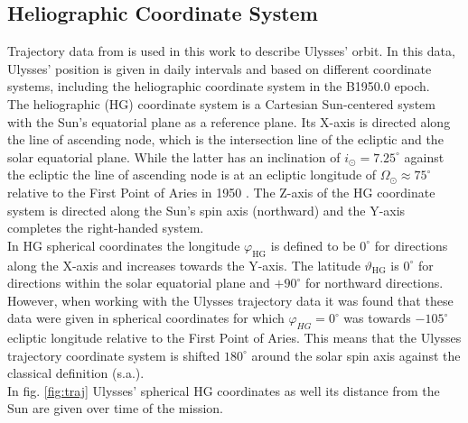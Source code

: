 \subsection{Heliographic Coordinate System}
Trajectory data from \citet{ulysses-data-archive} is used in this work to describe Ulysses' orbit. In this data, Ulysses' position is given in daily intervals and based on different coordinate systems, including the heliographic coordinate system in the B1950.0 epoch.\\
The heliographic (HG) coordinate system is a Cartesian Sun-centered system with the Sun's equatorial plane as a reference plane. Its X-axis is directed along the line of ascending node, which is the intersection line of the ecliptic and the solar equatorial plane. While the latter has an inclination of $i_\odot = 7.25 ^\circ$ against the ecliptic \citep{fraenz_harper} the line of ascending node is at an ecliptic longitude of $\Omega_\odot \approx 75^\circ$ relative to the First Point of Aries in 1950 \citep{nasa-earth-coord}. The Z-axis of the HG coordinate system is directed along the Sun's spin axis (northward) and the Y-axis completes the right-handed system. \\
In HG spherical coordinates the longitude $\varphi_{\mathrm{HG}}$ is defined to be $0^\circ$ for directions along the X-axis and increases towards the Y-axis. The latitude $\vartheta_{\mathrm{HG}}$ is $0^\circ$ for directions within the solar equatorial plane and $+90^\circ$ for northward directions.\\ 
However, when working with the Ulysses trajectory data it was found that these data were given in spherical coordinates for which $\varphi_{HG} = 0^\circ$ was towards $-105 ^\circ$ ecliptic longitude relative to the First Point of Aries. This means that the Ulysses trajectory coordinate system is shifted $180^\circ$ around the solar spin axis against the classical definition (s.a.).\\
In fig. \ref{fig:traj} Ulysses' spherical HG coordinates as well its distance from the Sun are given over time of the mission.
%
